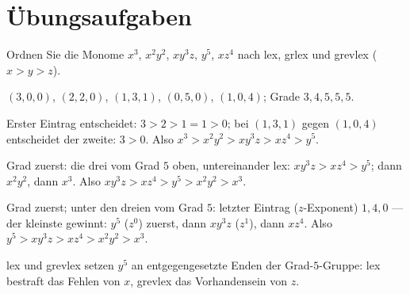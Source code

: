 \section{Übungsaufgaben}

\begin{aufgabe}
Ordnen Sie die Monome $x^{3}$, $x^{2}y^{2}$, $xy^{3}z$, $y^{5}$, $xz^{4}$ nach lex, grlex und grevlex ($x > y > z$).

\loesung
{}
$(3,0,0)$, $(2,2,0)$, $(1,3,1)$, $(0,5,0)$, $(1,0,4)$; Grade $3, 4, 5, 5, 5$.

Erster Eintrag entscheidet: $3 > 2 > 1 = 1 > 0$; bei $(1,3,1)$ gegen $(1,0,4)$ entscheidet der zweite: $3 > 0$. Also $x^{3} > x^{2}y^{2} > xy^{3}z > xz^{4} > y^{5}$.

Grad zuerst: die drei vom Grad $5$ oben, untereinander lex: $xy^{3}z > xz^{4} > y^{5}$; dann $x^{2}y^{2}$, dann $x^{3}$. Also $xy^{3}z > xz^{4} > y^{5} > x^{2}y^{2} > x^{3}$.

Grad zuerst; unter den dreien vom Grad $5$: letzter Eintrag ($z$-Exponent) $1, 4, 0$ --- der kleinste gewinnt: $y^{5}$ ($z^{0}$) zuerst, dann $xy^{3}z$ ($z^{1}$), dann $xz^{4}$. Also $y^{5} > xy^{3}z > xz^{4} > x^{2}y^{2} > x^{3}$.

lex und grevlex setzen $y^{5}$ an entgegengesetzte Enden der Grad-$5$-Gruppe: lex bestraft das Fehlen von $x$, grevlex das Vorhandensein von $z$. \checkmark

\begin{center}
\begin{minipage}{0.88\textwidth}
\end{minipage}
\end{center}
\end{aufgabe}

